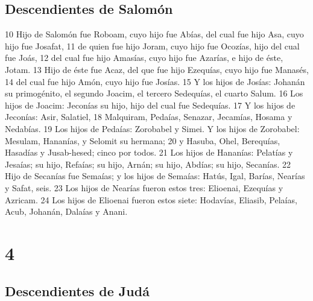 \section*{Descendientes de Salomón}

10 Hijo de Salomón fue Roboam, cuyo hijo fue Abías, del cual fue hijo Asa, cuyo hijo fue Josafat,
11 de quien fue hijo Joram, cuyo hijo fue Ocozías, hijo del cual fue Joás,
12 del cual fue hijo Amasías, cuyo hijo fue Azarías, e hijo de éste, Jotam.
13 Hijo de éste fue Acaz, del que fue hijo Ezequías, cuyo hijo fue Manasés,
14 del cual fue hijo Amón, cuyo hijo fue Josías.
15 Y los hijos de Josías: Johanán su primogénito, el segundo Joacim, el tercero Sedequías, el cuarto Salum.
16 Los hijos de Joacim: Jeconías su hijo, hijo del cual fue Sedequías.
17 Y los hijos de Jeconías: Asir, Salatiel,
18 Malquiram, Pedaías, Senazar, Jecamías, Hosama y Nedabías.
19 Los hijos de Pedaías: Zorobabel y Simei. Y los hijos de Zorobabel: Mesulam, Hananías, y Selomit su hermana;
20 y Hasuba, Ohel, Berequías, Hasadías y Jusab-hesed; cinco por todos.
21 Los hijos de Hananías: Pelatías y Jesaías; su hijo, Refaías; su hijo, Arnán; su hijo, Abdías; su hijo, Secanías.
22 Hijo de Secanías fue Semaías; y los hijos de Semaías: Hatús, Igal, Barías, Nearías y Safat, seis.
23 Los hijos de Nearías fueron estos tres: Elioenai, Ezequías y Azricam.
24 Los hijos de Elioenai fueron estos siete: Hodavías, Eliasib, Pelaías, Acub, Johanán, Dalaías y Anani.

\chapter{4}

\section*{Descendientes de Judá}

